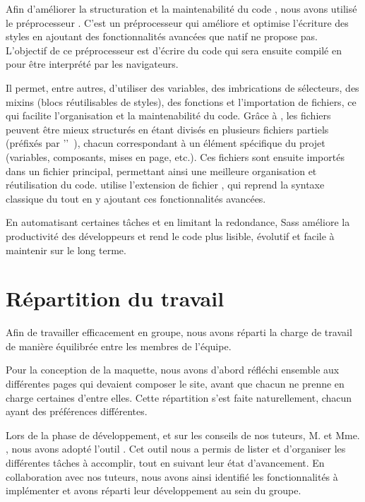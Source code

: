 Afin d’améliorer la structuration et la maintenabilité du code , nous avons utilisé le préprocesseur .
C'est un préprocesseur  qui améliore et optimise l'écriture des styles en ajoutant des fonctionnalités avancées que  natif ne propose pas.
L'objectif de ce préprocesseur est d'écrire du code  qui sera ensuite compilé en  pour être interprété par les navigateurs.

Il permet, entre autres, d’utiliser des variables, des imbrications de sélecteurs, des mixins (blocs réutilisables de styles), des fonctions et l’importation de fichiers, ce qui facilite l'organisation et la maintenabilité du code.
Grâce à , les fichiers  peuvent être mieux structurés en étant divisés en plusieurs fichiers partiels (préfixés par '\logo{\_}'~), chacun correspondant à un élément spécifique du projet (variables, composants, mises en page, etc.). 
Ces fichiers sont ensuite importés dans un fichier principal, permettant ainsi une meilleure organisation et réutilisation du code.
 utilise l’extension de fichier , qui reprend la syntaxe classique du  tout en y ajoutant ces fonctionnalités avancées.

En automatisant certaines tâches et en limitant la redondance, Sass améliore la productivité des développeurs et rend le code plus lisible, évolutif et facile à maintenir sur le long terme.

\section{Répartition du travail}
\label{sec:repartition-travail}

Afin de travailler efficacement en groupe, nous avons réparti la charge de travail de manière équilibrée entre les membres de l'équipe.

Pour la conception de la maquette, nous avons d'abord réfléchi ensemble aux différentes pages qui devaient composer le site, avant que chacun ne prenne en charge certaines d’entre elles. Cette répartition s’est faite naturellement, chacun ayant des préférences différentes.

Lors de la phase de développement, et sur les conseils de nos tuteurs, M.  et Mme. , nous avons adopté l’outil . Cet outil nous a permis de lister et d’organiser les différentes tâches à accomplir, tout en suivant leur état d'avancement. En collaboration avec nos tuteurs, nous avons ainsi identifié les fonctionnalités à implémenter et avons réparti leur développement au sein du groupe.

